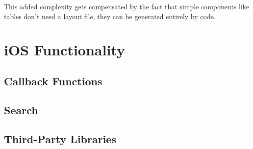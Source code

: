 This added complexity gets compensated by the fact that simple components like tables don't need a layout file, they can be generated entirely by code.
\section{iOS Functionality}

\subsection{Callback Functions}\label{callback:ios}

\subsection{Search}

\subsection{Third-Party Libraries}
